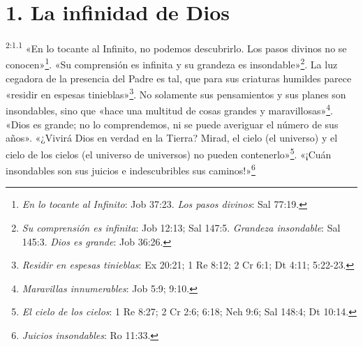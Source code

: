 \section*{1. La infinidad de Dios}
\par
\textsuperscript{2:1.1} «En lo tocante al Infinito, no podemos descubrirlo. Los pasos divinos no se conocen»\footnote{\textit{En lo tocante al Infinito}: Job 37:23. \textit{Los pasos divinos}: Sal 77:19.}. «Su comprensión es infinita y su grandeza es insondable»\footnote{\textit{Su comprensión es infinita}: Job 12:13; Sal 147:5. \textit{Grandeza insondable}: Sal 145:3. \textit{Dios es grande}: Job 36:26.}. La luz cegadora de la presencia del Padre es tal, que para sus criaturas humildes parece «residir en espesas tinieblas»\footnote{\textit{Residir en espesas tinieblas}: Ex 20:21; 1 Re 8:12; 2 Cr 6:1; Dt 4:11; 5:22-23.}. No solamente sus pensamientos y sus planes son insondables, sino que «hace una multitud de cosas grandes y maravillosas»\footnote{\textit{Maravillas innumerables}: Job 5:9; 9:10.}. «Dios es grande; no lo comprendemos, ni se puede averiguar el número de sus años». «¿Vivirá Dios en verdad en la Tierra? Mirad, el cielo (el universo) y el cielo de los cielos (el universo de universos) no pueden contenerlo»\footnote{\textit{El cielo de los cielos}: 1 Re 8:27; 2 Cr 2:6; 6:18; Neh 9:6; Sal 148:4; Dt 10:14.}. «¡Cuán insondables son sus juicios e indescubribles sus caminos!»\footnote{\textit{Juicios insondables}: Ro 11:33.}

